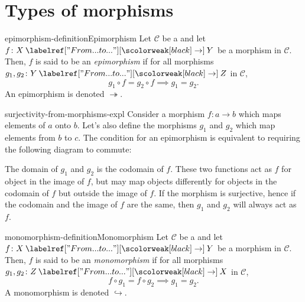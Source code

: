 \documentclass[preview]{standalone}
\begin{document}
\section{Types of morphisms}

\begin{snippetdefinition}{epimorphism-definition}{Epimorphism}
    Let \(\mathcal{C}\) be a \category
    and let \(f \colon X \fromto Y\) be a morphism in \(\mathcal{C}\).
    Then, \(f\) is said to be an \emph{epimorphism} if
    for all morphisms \(g_1, g_2 \colon Y \fromto Z\) in \(\mathcal{C}\),
    \[
        g_1 \circ f = g_2 \circ f \implies g_1 = g_2.
    \]
    An epimorphism is denoted \(\twoheadrightarrow\).
\end{snippetdefinition}


\begin{snippet}{surjectivity-from-morphisms-expl}
    Consider a morphism \(f\colon a \rightarrow b\) which maps elements of \(a\) onto \(b\).
    Let's also define the morphisms \(g_1\) and \(g_2\) which map elements from \(b\) to \(c\).
    The condition for an epimorphism is equivalent to requiring the following
    diagram to commute:
    \begin{center}
    \end{center}
    The domain of \(g_1\) and \(g_2\) is the codomain of \(f\). These two functions act
    as \(f\) for object in the image of \(f\), but may map objects differently
    for objects in the codomain of \(f\) but outside the image of \(f\).
    If the morphism is surjective, hence if the codomain and the image of \(f\) are the same,
    then \(g_1\) and \(g_2\) will always act as \(f\).
\end{snippet}

\begin{snippetdefinition}{monomorphism-definition}{Monomorphism}
    Let \(\mathcal{C}\) be a \category
    and let \(f \colon X \fromto Y\) be a morphism in \(\mathcal{C}\).
    Then, \(f\) is said to be an \emph{monomorphism} if
    for all morphisms \(g_1, g_2 \colon Z \fromto X\) in \(\mathcal{C}\),
    \[
        f \circ g_1 = f \circ g_2 \implies g_1 = g_2.
    \]
    A monomorphism is denoted \(\hookrightarrow\).
\end{snippetdefinition}
\end{document}
